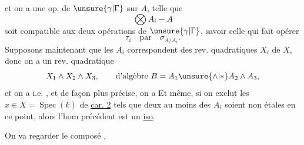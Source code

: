 et  on a une  op. de $\unsure{\gamma|\Gamma}$ sur $A$, telle que
\[
 \bigotimes A_i\mathbin{-}A
\]
soit compatible aux deux opérations de $\unsure{\gamma|\Gamma}$, savoir celle qui fait opérer
\[
 \tau_i\quad\text{par}\quad\sigma_{A/A_i}.
\]
Supposons maintenant que les $A_i$ correspondent  des rev. quadratiques $X_i$ de $X$, donc on a un rev. quadratique
\[
 X_1\wedge X_2\wedge X_3,\qquad\text{d'algèbre }B=A_1\unsure{\wedge|*}A_2\wedge A_3,
\]
et on a
i.e.
,
et de façon plus précise, on a
Et même, si on exclut les $x\in X=\operatorname{Spec}(k)$ de \uline{car. 2} tels que deux au moins des $A_i$ soient non étales en ce point, alors l'hom précédent est un \uline{iso}.

On va regarder le composé
, 
